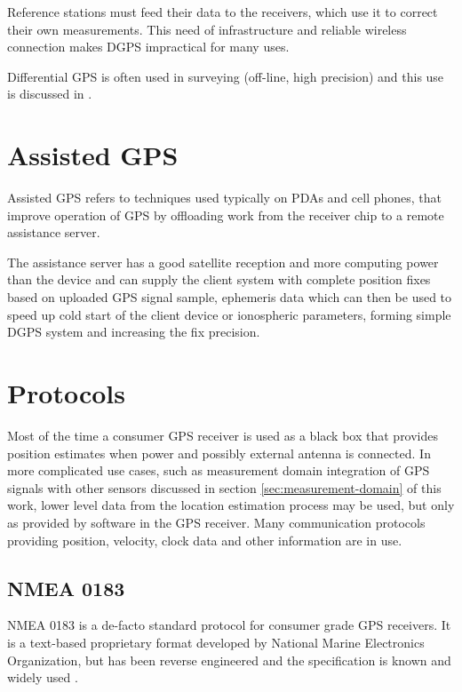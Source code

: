 Reference stations must feed their data to the receivers, which use it to correct their own measurements.
This need of infrastructure and reliable wireless connection makes DGPS impractical for many uses.


Differential GPS is often used in surveying (off-line, high precision) and this
use is discussed in \cite{rizos99}.

\section{Assisted GPS}
Assisted GPS refers to techniques used typically on PDAs and cell phones, that improve operation of GPS by offloading
work from the receiver chip to a remote assistance server.

The assistance server has a good satellite reception and more computing power than the device
and can supply the client system with complete position fixes based on uploaded GPS signal sample,
ephemeris data which can then be used to speed up cold start of the client device or
ionospheric parameters, forming simple DGPS system and increasing the fix precision.



\section{Protocols}
Most of the time a consumer GPS receiver is used as a black box that provides position
estimates when power and possibly external antenna is connected.
In more complicated use cases, such as measurement domain integration of GPS signals with
other sensors discussed in section \ref{sec:measurement-domain} of this work,
lower level data from the location estimation process may be used, but only as provided
by software in the GPS receiver.
Many communication protocols providing position, velocity, clock data
and other information are in use.

\subsection{NMEA 0183}
NMEA 0183 is a de-facto standard protocol for consumer grade GPS receivers.
It is a text-based proprietary format developed by National Marine Electronics Organization,
but has been reverse engineered and the specification is known and widely used \cite{depriest}.

